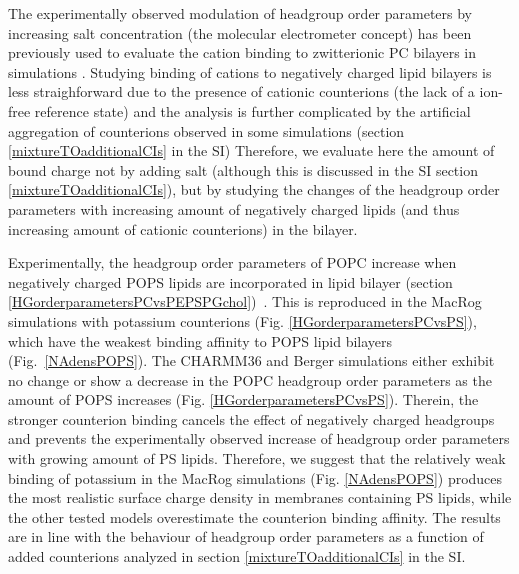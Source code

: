 \documentclass[aps,prl,superscriptaddress,twocolumn]{revtex4}
\begin{document}
The experimentally observed modulation of headgroup order parameters
by increasing salt concentration (the molecular electrometer concept) has been previously used to evaluate the cation binding to zwitterionic PC bilayers in simulations \cite{catte16}.
Studying binding of cations to negatively charged lipid bilayers is less straighforward due to the presence of cationic counterions (the lack of a ion-free reference state) and the analysis is further complicated by the artificial aggregation of counterions
observed in some simulations (section \ref{mixtureTOadditionalCIs} in the SI)
Therefore, we evaluate here the amount of bound charge not by adding salt
(although this is discussed in the SI section \ref{mixtureTOadditionalCIs}),
but by studying the changes of the headgroup order parameters with increasing amount of
negatively charged lipids (and thus increasing amount of cationic counterions) in the bilayer.

Experimentally, the headgroup order parameters of POPC
increase when negatively charged POPS lipids are incorporated in lipid bilayer
(section \ref{HGorderparametersPCvsPEPSPGchol})~\cite{seelig87,scherer87}.
This is reproduced in the MacRog simulations with potassium counterions (Fig. \ref{HGorderparametersPCvsPS}),
which have the weakest binding affinity to POPS lipid bilayers (Fig.~\ref{NAdensPOPS}).
The CHARMM36 and Berger simulations either exhibit no change or show a decrease
in the POPC headgroup order parameters as the amount of POPS increases (Fig. \ref{HGorderparametersPCvsPS}).
Therein, the stronger counterion binding cancels
the effect of negatively charged headgroups and prevents the experimentally observed
increase of headgroup order parameters with growing amount of PS lipids.
Therefore, we suggest that the relatively weak binding of potassium
in the MacRog simulations (Fig. \ref{NAdensPOPS}) produces the most
realistic surface charge density in membranes containing PS lipids,
while the other tested models overestimate the counterion
binding affinity. The results are in line with the behaviour of headgroup order
parameters as a function of added counterions analyzed in section \ref{mixtureTOadditionalCIs}
in the SI.
\end{document}
